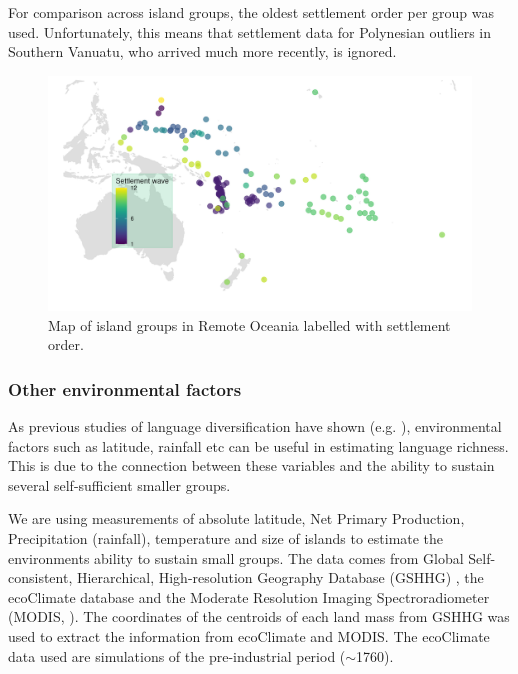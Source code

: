 \documentclass[12pt,letterpaper]{article}
\begin{document}
For comparison across island groups, the oldest settlement order per group was used. Unfortunately, this means that settlement data for Polynesian outliers in Southern Vanuatu, who arrived much more recently, is ignored.

\begin{figure}
\centering
\includegraphics[width=19cm]{Map_RO_dates.png}
\caption{{Map of island groups in Remote Oceania labelled with settlement order.}}
\label{dates_map}
\end{figure}

\FloatBarrier
\subsubsection{Other environmental factors} 
\label{appendix_environ}
As previous studies of language diversification have shown (e.g. \citet{ greenhill2015demographic, gavin2017process, Pacheco_Coelho_2019, hua2019ecological}), environmental factors such as latitude, rainfall etc can be useful in estimating language richness. This is due to the connection between these variables and the ability to sustain several self-sufficient smaller groups.


We are using measurements of absolute latitude, Net Primary Production, Precipitation (rainfall), temperature and size of islands to estimate the environments ability to sustain small groups. The data comes from Global Self-consistent, Hierarchical, High-resolution Geography Database (GSHHG) \citep{wessel1996global}, the ecoClimate database \citep{ecoclimate} and the Moderate Resolution Imaging Spectroradiometer (MODIS, \citet{running2021modis_terra, running2021modis_aqua}). The coordinates of the centroids of each land mass from GSHHG was used to extract the information from ecoClimate and MODIS. The ecoClimate data used are simulations of the pre-industrial period ($\sim$1760).
\end{document}
